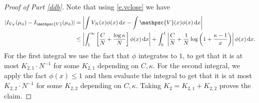 \documentclass[reqno,11pt]{amsart}
\numberwithin{equation}{section}
\theoremstyle{definition}
\newcommand*\diff{\mathop{}\!\mathrm{d}}
\begin{document}
\begin{proof}[Proof of Part \ref{ddb}] Note that using \eqref{e.vclose} we have
\begin{align*}
    |I_{V_N}(\mu_\phi)- I_{\mathpzc{V}}(\mu_\phi)| & = \left|\int V_N(x)\phi(x)\diff x-\int \mathpzc{V}(x)\phi(x)\diff x\right| \\ & \le  \left|\int_{1}^{\infty} \left[\frac{C}N+\frac{\log\kappa}{N} \right]\phi(x)\diff x\right| + \int_{0}^1 \left|\frac{C}N+\frac1N\log\left(1+\frac{\kappa-1}x\right)\right|\phi(x)\diff x.
\end{align*}
For the first integral we use the fact that $\phi$ integrates to $1$, to get that it is at most $K_{2,1}\cdot N^{-1}$ for some $K_{2,1}$ depending on $C,\kappa$. For the second integral, we apply the fact $\phi(x)\le 1$ and then evaluate the integral to get that it is at most $K_{2,2}\cdot N^{-1}$ for some $K_{2,2}$ depending on $C,\kappa$. Taking $K_2=K_{2,1}+K_{2,2}$ proves the claim.
\end{proof}
\end{document}
